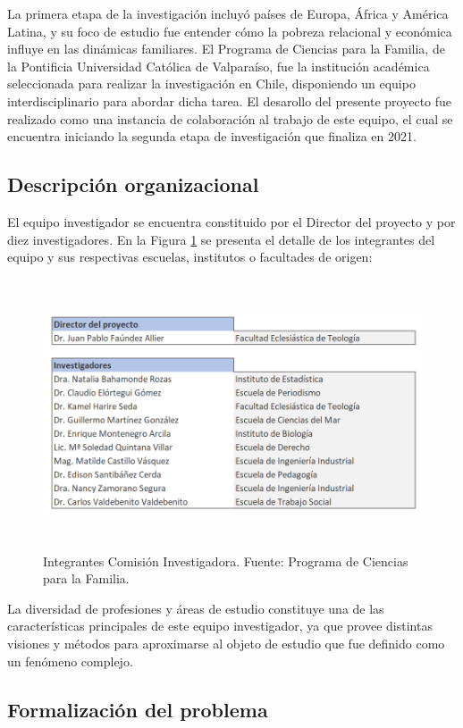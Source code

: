 \documentclass[12pt,letterpaper,spanish]{article}
\begin{document}
La primera etapa de la investigación incluyó países de Europa, África y América Latina, y su foco de estudio fue entender cómo la pobreza relacional y económica influye en las dinámicas familiares. El Programa de Ciencias para la Familia, de la Pontificia Universidad Católica de Valparaíso, fue la institución académica seleccionada para realizar la investigación en Chile, disponiendo un equipo interdisciplinario para abordar dicha tarea. El desarollo del presente proyecto fue realizado como una instancia de colaboración al trabajo de este equipo, el cual se encuentra iniciando la segunda etapa de investigación que finaliza en 2021. 

\newpage
\subsection{Descripción organizacional}
El equipo investigador se encuentra constituido por el Director del proyecto y por diez investigadores. En la Figura \ref{equipoInv} se presenta el detalle de los integrantes del equipo y sus respectivas escuelas, institutos o facultades de origen:
\begin{figure}[H]
    \centering
        \includegraphics[height=8cm]{Heatmaps/EquipoInvestigador.png}
    \caption{Integrantes Comisión Investigadora. Fuente: Programa de Ciencias para la Familia.}
    \label{equipoInv}
\end{figure}
La diversidad de profesiones y áreas de estudio constituye una de las características principales de este equipo investigador, ya que provee distintas visiones y métodos para aproximarse al objeto de estudio que fue definido como un fenómeno complejo. 

\subsection{Formalización del problema}
\end{document}
